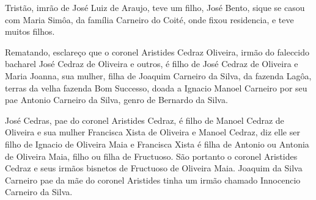 Tristão, imrão de José Luiz de Araujo, teve um filho, José Bento, sique se casou com Maria Simôa, da família Carneiro do Coité, onde fixou residencia, e teve muitos filhos.

Rematando, esclareço que o coronel Aristides Cedraz Oliveira, irmão do faleccido bacharel José Cedraz de Oliveira e outros, é filho de José Cedraz de Oliveira e Maria Joanna, sua mulher, filha de Joaquim Carneiro da Silva, da fazenda Lagôa, terras da velha fazenda Bom Successo, doada a Ignacio Manoel Carneiro por seu pae Antonio Carneiro da Silva, genro de Bernardo da Silva.

José Cedras, pae do coronel Aristides Cedraz, é filho de Manoel Cedraz de Oliveira e sua mulher Francisca Xista de Oliveira e Manoel Cedraz, diz elle ser filho de Ignacio de Oliveira Maia e Francisca  Xista é filha de Antonio ou Antonia de Oliveira Maia, filho ou filha de Fructuoso. São portanto o coronel Aristides Cedraz e seus irmãos bisnetos de Fructuoso de Oliveira Maia. Joaquim da Silva Carneiro pae da mãe do coronel Aristides tinha um irmão chamado Innocencio Carneiro da Silva.
